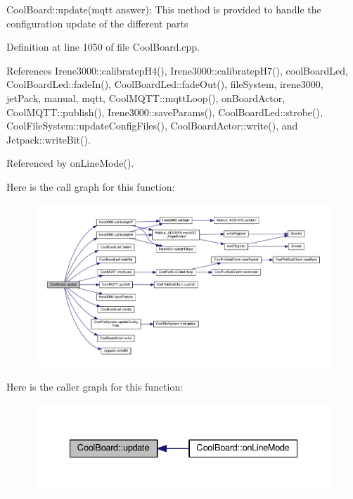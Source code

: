 Cool\+Board\+::update(mqtt answer)\+: This method is provided to handle the configuration update of the different parts 

Definition at line 1050 of file Cool\+Board.\+cpp.



References Irene3000\+::calibratep\+H4(), Irene3000\+::calibratep\+H7(), cool\+Board\+Led, Cool\+Board\+Led\+::fade\+In(), Cool\+Board\+Led\+::fade\+Out(), file\+System, irene3000, jet\+Pack, manual, mqtt, Cool\+M\+Q\+T\+T\+::mqtt\+Loop(), on\+Board\+Actor, Cool\+M\+Q\+T\+T\+::publish(), Irene3000\+::save\+Params(), Cool\+Board\+Led\+::strobe(), Cool\+File\+System\+::update\+Config\+Files(), Cool\+Board\+Actor\+::write(), and Jetpack\+::write\+Bit().



Referenced by on\+Line\+Mode().

Here is the call graph for this function\+:
\nopagebreak
\begin{figure}[H]
\begin{center}
\leavevmode
\includegraphics[width=350pt]{d7/df9/class_cool_board_a8612756d3f73198cdde857a66f0fe690_cgraph}
\end{center}
\end{figure}
Here is the caller graph for this function\+:
\nopagebreak
\begin{figure}[H]
\begin{center}
\leavevmode
\includegraphics[width=335pt]{d7/df9/class_cool_board_a8612756d3f73198cdde857a66f0fe690_icgraph}
\end{center}
\end{figure}
\mbox{\label{class_cool_board_ae6b5e1274d760462290192acea4adca8}} 
